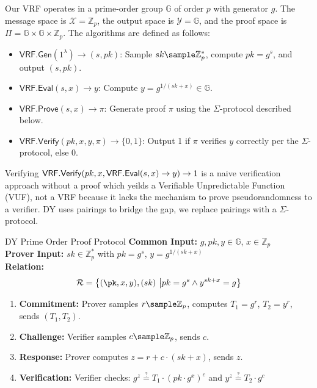 Our VRF operates in a prime-order group $\mathbb{G}$ of order $p$ with generator $g$. The message space is $\mathcal{X} = \mathbb{Z}_p$, the output space is $\mathcal{Y} = \mathbb{G}$, and the proof space is $\Pi = \mathbb{G} \times \mathbb{G} \times \mathbb{Z}_p$. The algorithms are defined as follows:

\begin{itemize}
    \item $\mathsf{VRF.Gen}(1^\lambda) \to (s, pk)$: Sample $sk \sample \mathbb{Z}_p^*$, compute $pk = g^{s}$, and output $(s, pk)$.
    \item $\mathsf{VRF.Eval}(s, x) \to y$: Compute $y = g^{1/(sk + x)} \in \mathbb{G}$.
    \item $\mathsf{VRF.Prove}(s, x) \to \pi$: Generate proof $\pi$ using the $\Sigma$-protocol described below.
    \item $\mathsf{VRF.Verify}(pk, x, y, \pi) \to \{0, 1\}$: Output 1 if $\pi$ verifies $y$ correctly per the $\Sigma$-protocol, else 0.
\end{itemize}

\begin{remark}
    Verifying $\mathsf{VRF.Verify}(pk, x, \mathsf{VRF.Eval}(s, x) \to y) \to 1$ is a naive verification approach without a proof which yeilds a Verifiable Unpredictable Function (VUF), not a VRF because it lacks the mechanism to prove pseudorandomness to a verifier. DY uses pairings to bridge the gap, we replace pairings with a $\Sigma$-protocol. 
\end{remark}

\begin{protocol}{DY Prime Order Proof Protocol}{}\label{protocol-pdy-protocol1}
\textbf{Common Input:} $g, pk, y \in \mathbb{G}$, $x \in \mathbb{Z}_p$ \\
\textbf{Prover Input:} $sk \in \mathbb{Z}_p^*$ with $pk = g^{s}$, $y = g^{1/(sk + x)}$ \\
\textbf{Relation: }
\[
\mathcal{R} = \left\{ (\pk, x, y), (sk) \ \middle| pk = g^{s} \land y^{sk + x} = g \right\}
\]
\begin{enumerate}
    \item \textbf{Commitment:} Prover samples $r \sample  \mathbb{Z}_p$, computes $T_1 = g^r$, $T_2 = y^r$, sends $(T_1, T_2)$.
    \item \textbf{Challenge:} Verifier samples $c \sample  \mathbb{Z}_p$, sends $c$.
    \item \textbf{Response:} Prover computes $z = r + c \cdot (sk + x)$, sends $z$.
    \item \textbf{Verification:} Verifier checks: $g^z \stackrel{?}{=} T_1 \cdot (pk \cdot g^x)^c$ and $y^z \stackrel{?}{=} T_2 \cdot g^c$
\end{enumerate}
\end{protocol}

